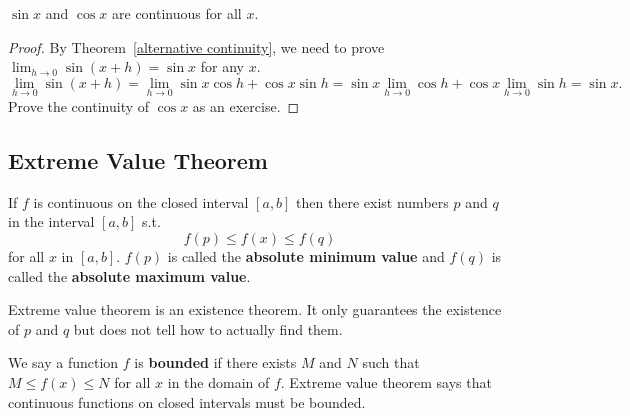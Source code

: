 \documentclass[../calc1-main.tex]{subfiles}
\begin{document}
\begin{theorem}
	$\sin x$ and $\cos x$ are continuous for all $x$.
\end{theorem}
\begin{proof}
	By Theorem~\ref{alternative continuity}, we need to prove $\lim_{h \to 0} \sin (x+h) = \sin x$ for any $x$.
	\[
		\lim_{h \to 0} \sin(x+h) =
		\lim_{h \to 0} \sin x \cos h + \cos x \sin h =
		\sin x \lim_{h \to 0} \cos h + \cos x \lim_{h \to 0} \sin h = \sin x.
	\]
	Prove the continuity of $\cos x$ as an exercise.
\end{proof}
\subsection*{Extreme Value Theorem}

\begin{theorem}
	If $f$ is continuous on the closed interval $[a, b]$ then there exist numbers $p$ and $q$ in the interval $[a,b]$ s.t.
	\[
		f(p) \leq f(x) \leq f(q)
	\]
	for all $x$ in $[a, b]$.
	$f(p)$ is called the \textbf{absolute minimum value} and $f(q)$ is called the \textbf{absolute maximum value}.
\end{theorem}

Extreme value theorem is an existence theorem. It only guarantees the existence of $p$ and $q$ but does not tell how to actually find them.

We say a function $f$ is \textbf{bounded} if there exists $M$ and $N$ such that $M \le f(x) \le N$ for all $x$ in the domain of $f$. Extreme value theorem says that continuous functions on closed intervals must be bounded.
\end{document}
